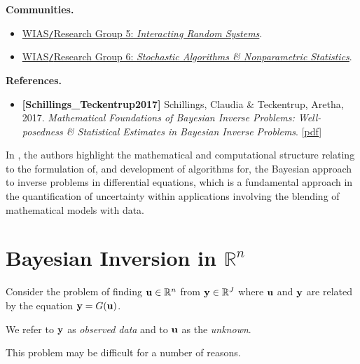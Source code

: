 \documentclass[oneside,11pt]{book}
\numberwithin{equation}{section}
\begin{document}
\textbf{Communities.}
\begin{itemize}
    \item \href{https://www.wias-berlin.de/research/rgs/fg5/index.jsp}{WIAS\texttt{/}Research Group 5: \textit{Interacting Random Systems}}.
    \item \href{https://www.wias-berlin.de/research/rgs/fg6/index.jsp}{WIAS\texttt{/}Research Group 6: \textit{Stochastic Algorithms \& Nonparametric Statistics}}.
\end{itemize}
\textbf{References.}
\begin{itemize}
    \item \textbf{[Schillings\_Teckentrup2017]} Schillings, Claudia \& Teckentrup, Aretha,
    2017. \textit{Mathematical Foundations of Bayesian Inverse Problems: Well-posedness \& Statistical Estimates in Bayesian Inverse Problems}. [\href{https://github.com/NQBH/reference/blob/master/Schillings_Teckentrup2017_part_1.pdf}{pdf}]
\end{itemize}
In \cite{Dashti_Stuart2017}, the authors highlight the mathematical and computational structure relating to the formulation of, and development of algorithms for, the Bayesian approach to inverse problems in differential equations, which is a fundamental approach in the quantification of uncertainty within applications involving the blending of mathematical models with data.

\section{Bayesian Inversion in $\mathbb{R}^n$}
Consider the problem of finding ${\bf u}\in\mathbb{R}^n$ from ${\bf y}\in\mathbb{R}^J$ where ${\bf u}$ and ${\bf y}$ are related by the equation ${\bf y} = G({\bf u})$.

We refer to ${\bf y}$ as \textit{observed data} and to ${\bf u}$ as the \textit{unknown}.

This problem may be difficult for a number of reasons.
\end{document}
